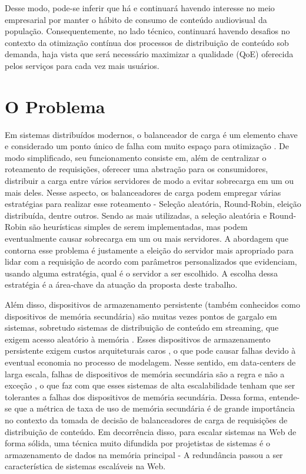 \documentclass[11pt]{article}
\begin{document}
Desse modo, pode-se inferir que há e continuará havendo interesse no meio empresarial por manter o hábito de consumo de conteúdo audiovisual da população. Consequentemente, no lado técnico, continuará havendo desafios no contexto da otimização contínua dos processos de distribuição de conteúdo sob demanda, haja vista que será necessário maximizar a qualidade (QoE) oferecida pelos serviços para cada vez mais usuários.

\section{O Problema} \label{sec:problema}

Em sistemas distribuídos modernos, o balanceador de carga é um elemento chave e considerado um ponto único de falha com muito espaço para otimização \cite{dos2019balanceamento}.
%
De modo simplificado, seu funcionamento consiste em, além de centralizar o roteamento de requisições, oferecer uma abstração para os consumidores, distribuir a carga entre vários servidores de modo a evitar sobrecarga em um ou mais deles.
%
Nesse aspecto, os balanceadores de carga podem empregar várias estratégias para realizar esse roteamento - Seleção aleatória, Round-Robin, eleição distribuída, dentre outros.
%
Sendo as mais utilizadas, a seleção aleatória e Round-Robin são heurísticas simples de serem implementadas, mas podem eventualmente causar sobrecarga em um ou mais servidores. A abordagem que contorna esse problema é justamente a eleição do servidor mais apropriado para lidar com a requisição de acordo com parâmetros personalizados que evidenciam, usando alguma estratégia, qual é o servidor a ser escolhido.
%
A escolha dessa estratégia é a área-chave da atuação da proposta deste trabalho.

Além disso, dispositivos de armazenamento persistente (também conhecidos como dispositivos de memória secundária) são muitas vezes pontos de gargalo em sistemas, sobretudo sistemas de distribuição de conteúdo em streaming, que exigem acesso aleatório à memória \cite{sivathanu2013IOWorkloads}.
%
Esses dispositivos de armazenamento persistente exigem custos arquiteturais caros \cite{arpaciDusseau98}, o que pode causar falhas devido à eventual economia no processo de modelagem. Nesse sentido, em data-centers de larga escala, falhas de dispositivos de memória secundária são a regra e não a exceção \cite{wuEtalIOWorkload}, o que faz com que esses sistemas de alta escalabilidade tenham que ser tolerantes a falhas dos dispositivos de memória secundária.  Dessa forma, entende-se que a métrica de taxa de uso de memória secundária é de grande importância no contexto da tomada de decisão de balanceadores de carga de requisições de distribuição de conteúdo.
%
Em decorrência disso, para escalar sistemas na Web de forma sólida, uma técnica muito difundida por projetistas de sistemas é o armazenamento de dados na memória principal - A redundância passou a ser característica de sistemas escaláveis na Web.
%
\end{document}
